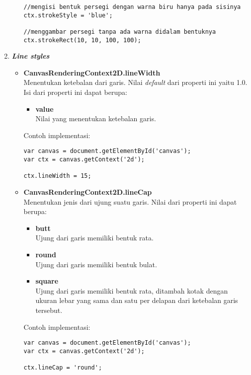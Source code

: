 \begin{enumerate}
\begin{itemize}
\begin{lstlisting}
//mengisi bentuk persegi dengan warna biru hanya pada sisinya
ctx.strokeStyle = 'blue'; 

//menggambar persegi tanpa ada warna didalam bentuknya
ctx.strokeRect(10, 10, 100, 100);	
\end{lstlisting}
	\end{itemize}

	\item \textbf{\textit{Line styles}} \\ 
	\begin{itemize}
		\item \textbf{CanvasRenderingContext2D.lineWidth} \\ Menentukan ketebalan dari garis. Nilai \textit{default} dari properti ini yaitu 1.0. Isi dari properti ini dapat berupa:
		\begin{itemize}
			\item \textbf{value} \\ Nilai yang menentukan ketebalan garis.
		\end{itemize}
		Contoh implementasi:
\begin{lstlisting}
var canvas = document.getElementById('canvas');
var ctx = canvas.getContext('2d');
	
ctx.lineWidth = 15;
\end{lstlisting}
	
		\item \textbf{CanvasRenderingContext2D.lineCap} \\ Menentukan jenis dari ujung suatu garis. Nilai dari properti ini dapat berupa:
		\begin{itemize}
			\item \textbf{butt} \\ Ujung dari garis memiliki bentuk rata.
			\item \textbf{round} \\ Ujung dari garis memiliki bentuk bulat.
			\item \textbf{square} \\ Ujung dari garis memiliki bentuk rata, ditambah kotak dengan ukuran lebar yang sama dan satu per delapan dari ketebalan garis tersebut.
		\end{itemize}
		Contoh implementasi:
\begin{lstlisting}
var canvas = document.getElementById('canvas');
var ctx = canvas.getContext('2d');
	
ctx.lineCap = 'round';
\end{lstlisting}
	

\end{itemize}
\end{enumerate}
